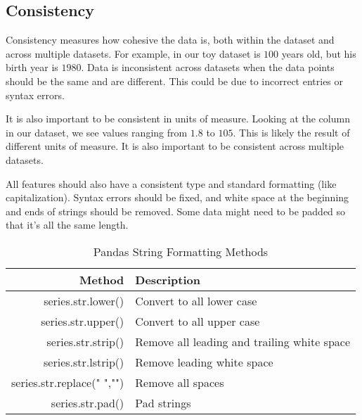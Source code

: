 \subsection*{Consistency}
Consistency measures how cohesive the data is, both within the dataset and across multiple datasets.
For example, in our toy dataset  is $100$ years old, but his birth year is $1980$.
Data is inconsistent across datasets when the data points should be the same and are different.
This could be due to incorrect entries or syntax errors.

It is also important to be consistent in units of measure.
Looking at the  column in our dataset, we see values ranging from $1.8$ to $105$.
This is likely the result of different units of measure.
It is also important to be consistent across multiple datasets.

All features should also have a consistent type and standard formatting (like capitalization).
Syntax errors should be fixed, and white space at the beginning and ends of strings should be removed.
Some data might need to be padded so that it's all the same length.


\begin{table}[H]

\centering
  \begin{tabular}{r|l}
	Method & Description \\
	\hline
	series.str.lower() & Convert to all lower case\\
	series.str.upper() & Convert to all upper case\\
	series.str.strip() & Remove all leading and trailing white space\\
	series.str.lstrip() & Remove leading white space\\
	series.str.replace(" ","")& Remove all spaces\\
	series.str.pad() & Pad strings\\
	\end{tabular}
\caption{Pandas String Formatting Methods}
\end{table}


